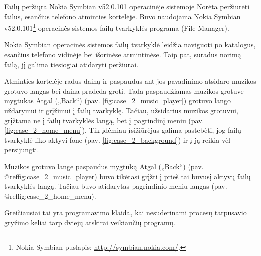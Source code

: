 \begin{xcase}{Failų peržiųra Nokia Symbian v52.0.101 operacinėje sistemoje}
  \xcgoal
  {
    Norėta peržiūrėti failus, esančius telefono atminties kortelėje. 
    Buvo naudojama Nokia Symbian v52.0.101\footnote{Nokia Symbian puslapis: \url{http://symbian.nokia.com/}.} 
    operacinės sistemos failų tvarkyklės programa (File Manager). 
  }
  
  \xctools
  {
    Nokia Symbian operacinės sistemos failų tvarkyklė leidžia naviguoti po
	katalogus, esančius telefono vidinėje bei išorinėse atmintinėse. Taip 
	pat, suradus norimą failą, jį galima tiesiogiai atidaryti peržiūrai.
  }
  
  \xcresult
  {
    Atminties kortelėje radus dainą ir paspaudus ant jos pavadinimo atsidaro muzikos
    grotuvo langas bei daina pradeda groti. Tada paspaudžiamas muzikos grotuve mygtukas 
    Atgal („Back“) (pav. \ref{fig:case_2_music_player}) grotuvo lango uždarymui 
    ir grįžimui į failų tvarkyklę. Tačiau, užsidarius muzikos grotuvui, grįžtama ne į
    failų tvarkyklės langą, bet į pagrindinį meniu (pav. \ref{fig:case_2_home_menu}). 
    Tik įdėmiau įsižiūrėjus galima pastebėti, jog failų tvarkyklė liko aktyvi fone 
    (pav. \ref{fig:case_2_background}) ir į ją reikia vėl persijungti.
	
    {
    }
  }
  
  \xcprinciples
  {
    {
      Muzikos grotuvo lange paspaudus mygtuką Atgal („Back“) (pav. @ref{fig:case_2_music_player}) buvo tikėtasi grįžti 
      į prieš tai buvusį aktyvų failų tvarkyklės langą. Tačiau buvo atidarytas 
      pagrindinio meniu langas (pav. @ref{fig:case_2_home_menu}).
    }
  }
  
  \xcthoughts
  {
    Greičiausiai tai yra programavimo klaida, kai nesuderinami procesų tarpusavio gryžimo keliai
    tarp dviejų atskirai veikiančių programų.
  }
\end{xcase}
